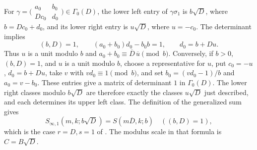 \documentclass[11pt]{amsart}
\numberwithin{equation}{section}
\theoremstyle{remark}
\begin{document}
For \(\gamma=\bigl(\begin{smallmatrix}a_0&b_0\\D c_0&d_0\end{smallmatrix}\bigr)
\in\Gamma_0(D)\), the lower left entry of \(\gamma\sigma_1\) is
\(b\sqrt D\), where \(b=Dc_0+d_0\), and its lower right entry is
\(u\sqrt D\), where \(u=-c_0\). The determinant implies
\[
 (b,D)=1,\qquad
 (a_0+b_0)d_0-b_0 b=1,\qquad d_0=b+Du.
\]
Thus \(u\) is a unit modulo \(b\) and
\(a_0+b_0\equiv\overline D\,\overline u\pmod b\).
Conversely, if \(b>0\), \((b,D)=1\), and \(u\) is a unit modulo \(b\),
choose a representative for \(u\), put \(c_0=-u\), \(d_0=b+Du\),
take \(v\) with \(v d_0\equiv1\pmod b\), and set
\(b_0=(v d_0-1)/b\) and \(a_0=v-b_0\). These entries give a matrix of
determinant \(1\) in \(\Gamma_0(D)\). The lower right classes modulo
\(b\sqrt D\) are therefore exactly the classes \(u\sqrt D\) just
described, and each determines its upper left class. The definition of
the generalized sum gives
\[
 S_{\infty,1}(m,k;b\sqrt D)=S(m\overline D,k;b)
 \quad ((b,D)=1),
\]
which is the case \(r=D,s=1\) of \cite[(3.12)]{PascadiPi}.
The modulus scale in that formula is \(C=B\sqrt D\).
\end{document}
